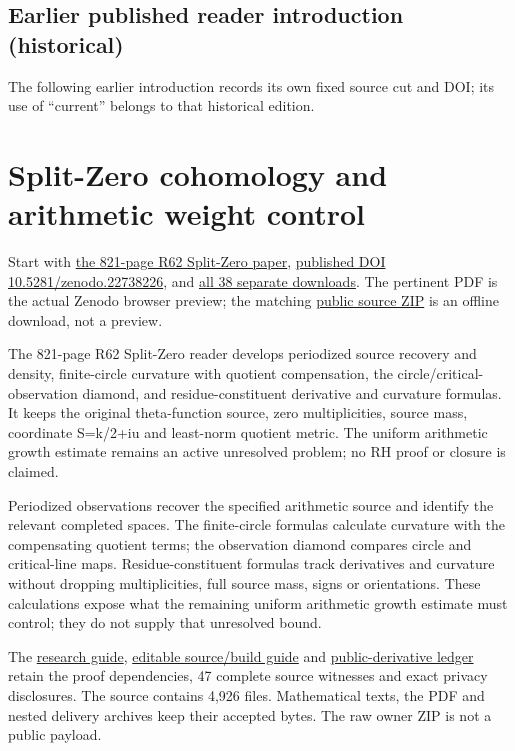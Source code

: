 \documentclass[
]{article}
\begin{document}
\subsection{Earlier published reader introduction
(historical)}\label{earlier-published-reader-introduction-historical}

The following earlier introduction records its own fixed source cut and
DOI; its use of ``current'' belongs to that historical edition.

\section{Split-Zero cohomology and arithmetic weight
control}\label{split-zero-cohomology-and-arithmetic-weight-control}

Start with
\href{https://zenodo.org/api/records/22738226/files/37-splitzero-periodized-residue-continuation-821p.pdf/content}{the
821-page R62 Split-Zero paper},
\href{https://doi.org/10.5281/zenodo.22738226}{published DOI
10.5281/zenodo.22738226}, and
\href{calculation_edition_20260913_periodized_residue/README.md}{all 38
separate downloads}. The pertinent PDF is the actual Zenodo browser
preview; the matching
\href{https://zenodo.org/api/records/22738226/files/38-splitzero-periodized-residue-public-sources.zip/content}{public
source ZIP} is an offline download, not a preview.

The 821-page R62 Split-Zero reader develops periodized source recovery
and density, finite-circle curvature with quotient compensation, the
circle/critical-observation diamond, and residue-constituent derivative
and curvature formulas. It keeps the original theta-function source,
zero multiplicities, source mass, coordinate S=k/2+iu and least-norm
quotient metric. The uniform arithmetic growth estimate remains an
active unresolved problem; no RH proof or closure is claimed.

Periodized observations recover the specified arithmetic source and
identify the relevant completed spaces. The finite-circle formulas
calculate curvature with the compensating quotient terms; the
observation diamond compares circle and critical-line maps.
Residue-constituent formulas track derivatives and curvature without
dropping multiplicities, full source mass, signs or orientations. These
calculations expose what the remaining uniform arithmetic growth
estimate must control; they do not supply that unresolved bound.

The \href{CURRENT_RESEARCH.md}{research guide},
\href{workbenches/splitzero-tandem/continuations/20260913-periodized-residue/README.md}{editable
source/build guide} and
\href{workbenches/splitzero-tandem/continuations/20260913-periodized-residue/PUBLIC_DERIVATION.md}{public-derivative
ledger} retain the proof dependencies, 47 complete source witnesses and
exact privacy disclosures. The source contains 4,926 files. Mathematical
texts, the PDF and nested delivery archives keep their accepted bytes.
The raw owner ZIP is not a public payload.
\end{document}
